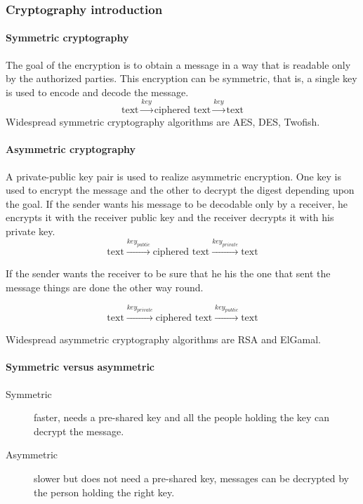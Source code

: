 \subsubsection*{Cryptography introduction}

\paragraph{Symmetric cryptography}
The goal of the encryption is to obtain a message in a way that is readable
only by the authorized parties.
This encryption can be symmetric, that is, a single key is used to encode and
decode the message.
\[ \text{text} \xrightarrow{key} \text{ciphered text} \xrightarrow{key} \text{text} \]
Widespread symmetric cryptography algorithms are AES, DES, Twofish.

\paragraph{Asymmetric cryptography}
A private-public key pair is used to realize asymmetric
encryption. One key is used to encrypt the message and the other to
decrypt the digest depending upon the goal. If the sender wants his
message to be decodable only by a receiver, he encrypts it with the
receiver public key and the receiver decrypts it with his private key.
\[ \text{text} \xrightarrow{key_{public}} \text{ciphered text} \xrightarrow{key_{private}} \text{text} \]

If the sender wants the receiver to be sure that he his the one that
sent the message things are done the other way round.

\[ \text{text} \xrightarrow{key_{private}} \text{ciphered text} \xrightarrow{key_{public}} \text{text} \]

Widespread asymmetric cryptography algorithms are RSA and ElGamal.

\paragraph{Symmetric versus asymmetric}

\begin{description}
\item[Symmetric]
faster, needs a pre-shared key and all the people holding the key can
decrypt the message.
\item[Asymmetric]
slower but does not need a pre-shared key, messages can be decrypted by the
person holding the right key.
\end{description}

